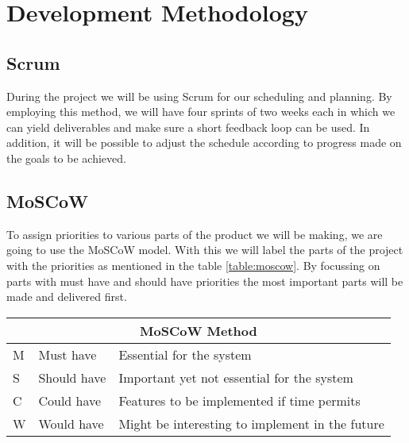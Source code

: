 \section{Development Methodology}
\subsection{Scrum}
During the project we will be using Scrum for our scheduling and planning. By employing this method, we will have four sprints of two weeks each in which we can yield deliverables and make sure a short feedback loop can be used. In addition, it will be possible to adjust the schedule according to progress made on the goals to be achieved.

\subsection{MoSCoW}
To assign priorities to various parts of the product we will be making, we are going to use the MoSCoW model. With this we will label the parts of the project with the priorities as mentioned in the table \ref{table:moscow}. By focussing on parts with must have and should have priorities the most important parts will be made and delivered first.\\[1cm]

{\renewcommand{\arraystretch}{1.5}
	\centering
	
	\begin{tabular}{ | l | l | l | }
		\multicolumn{3}{c}{\bfseries{MoSCoW Method}} \\ \hline
		M & Must have & Essential for the system\\ \hline
		S & Should have & Important yet not essential for the system \\ \hline
		C & Could have & Features to be implemented if time permits \\ \hline
		W & Would have & Might be interesting to implement in the future \\ \hline 
	\end{tabular}
	\label{table:moscow}
	
}
